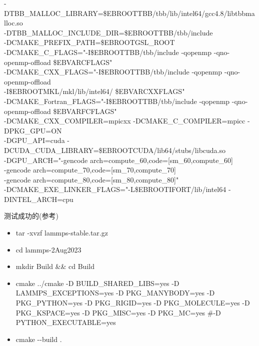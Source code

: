 \documentclass[10pt,a4paper]{article}
\begin{document}
-DTBB\_MALLOC\_LIBRARY=\$EBROOTTBB/tbb/lib/intel64/gcc4.8/libtbbmalloc.so \\
-DTBB\_MALLOC\_INCLUDE\_DIR=\$EBROOTTBB/tbb/include \\
-DCMAKE\_PREFIX\_PATH=\$EBROOTGSL\_ROOT \\
-DCMAKE\_C\_FLAGS="-I\$EBROOTTBB/tbb/include -qopenmp -qno-openmp-offload \$EBVARCFLAGS" \\
-DCMAKE\_CXX\_FLAGS="-I\$EBROOTTBB/tbb/include -qopenmp -qno-openmp-offload \\
-I\$EBROOTMKL/mkl/lib/intel64/ \$EBVARCXXFLAGS" \\
-DCMAKE\_Fortran\_FLAGS="-I\$EBROOTTBB/tbb/include -qopenmp -qno-openmp-offload \$EBVARFCFLAGS" \\
-DCMAKE\_CXX\_COMPILER=mpicxx -DCMAKE\_C\_COMPILER=mpicc -DPKG\_GPU=ON \\
-DGPU\_API=cuda -DCUDA\_CUDA\_LIBRARY=\$EBROOTCUDA/lib64/stubs/libcuda.so \\
-DGPU\_ARCH="-gencode arch=compute\_60,code=[sm\_60,compute\_60] \\
-gencode arch=compute\_70,code=[sm\_70,compute\_70] \\
-gencode arch=compute\_80,code=[sm\_80,compute\_80]" \\
-DCMAKE\_EXE\_LINKER\_FLAGS="-L\$EBROOTIFORT/lib/intel64 -DINTEL\_ARCH=cpu

测试成功的(参考)
\begin{itemize}
	\item \textrm{tar -xvzf lammps-stable.tar.gz}
	\item \textrm{cd lammps-2Aug2023}
	\item \textrm{mkdir Build \&\& cd Build}
	\item \textrm{cmake ../cmake -D BUILD\_SHARED\_LIBS=yes -D LAMMPS\_EXCEPTIONS=yes  -D PKG\_MANYBODY=yes -D PKG\_PYTHON=yes -D PKG\_RIGID=yes -D PKG\_MOLECULE=yes -D PKG\_KSPACE=yes -D PKG\_MISC=yes -D PKG\_MC=yes \#-D PYTHON\_EXECUTABLE=yes}
	\item \textrm{cmake -\/-build .}
\end{itemize}
\end{document}
